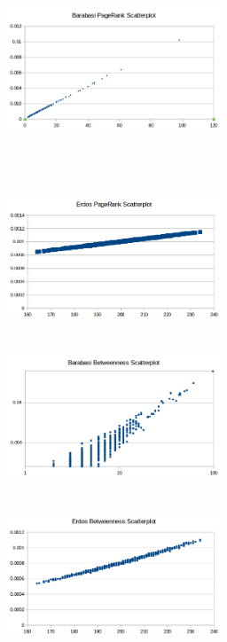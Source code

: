 \documentclass[spanish]{assignment}
\begin{document}
		\begin{figure}[ht!]
			\begin{subfigure}[t!]{0.5\textwidth}
				\begin{subfigure}[t!]{\textwidth}
					\centering
					\includegraphics[width=180pt, height=120pt]{img/barabasi_pr_s.png}
				\end{subfigure}\\
				\begin{subfigure}[t!]{\textwidth}
					\centering
					\includegraphics[width=180pt, height=120pt]{img/erdos_pr_s.png}
				\end{subfigure}
			\end{subfigure}
			\begin{subfigure}[t!]{0.5\textwidth}
				\begin{subfigure}[t!]{\textwidth}
					\centering
					\includegraphics[width=180pt, height=120pt]{img/barabasi_b_s.png}
				\end{subfigure}
				\begin{subfigure}[t!]{\textwidth}
					\centering
					\includegraphics[width=180pt, height=120pt]{img/erdos_b_s.png}

\end{subfigure}
\end{subfigure}
\end{figure}
\end{document}
